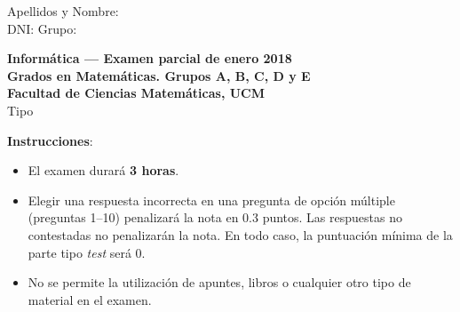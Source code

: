 \documentclass[10pt]{examdesign}
\begin{document}
\begin{examtop}
    \noindent Apellidos y Nombre:\dotfill \\
    \noindent DNI: \dotfill Grupo: \dotfill \\
  \begin{center}
    \textbf{Informática --- Examen parcial de enero 2018} \\
    \textbf{Grados en Matemáticas. Grupos A, B, C, D y E} \\
    \textbf{Facultad de Ciencias Matemáticas, UCM} \\
    Tipo \\
  \end{center}
\end{examtop}

\begin{exampreface}
\textbf{Instrucciones}:~\\
\begin{itemize}
\item El examen durará \textbf{3 horas}. 
\item Elegir una respuesta incorrecta en una pregunta de opción múltiple (preguntas 1--10) penalizará la nota en 0.3 puntos. Las respuestas no contestadas no penalizarán la nota. En todo caso, la puntuación mínima de la parte tipo \textit{test} será 0. 
\item No se permite la utilización de apuntes, libros o cualquier otro tipo de material en el examen. 

\end{itemize}



\end{exampreface}
\end{document}
